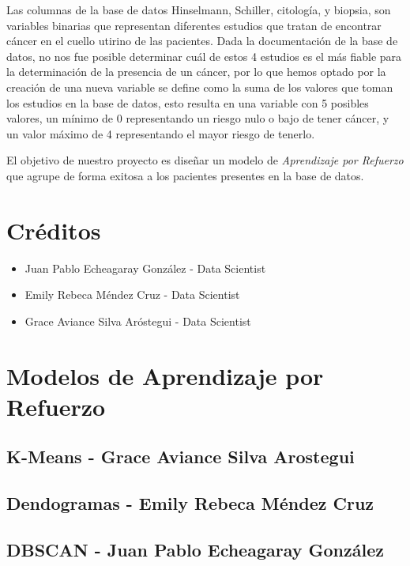\documentclass[journal]{IEEEtran}
\begin{document}
        Las columnas de la base de datos Hinselmann, Schiller, citología, y biopsia, son variables binarias que representan diferentes estudios que tratan de encontrar cáncer en el cuello utirino de las pacientes. Dada la documentación de la base de datos, no nos fue posible determinar cuál de estos 4 estudios es el más fiable para la determinación de la presencia de un cáncer, por lo que hemos optado por la creación de una nueva variable se define como la suma de los valores que toman los estudios en la base de datos, esto resulta en una variable con 5 posibles valores, un mínimo de 0 representando un riesgo nulo o bajo de tener cáncer, y un valor máximo de 4 representando el mayor riesgo de tenerlo.

        El objetivo de nuestro proyecto es diseñar un modelo de \emph{Aprendizaje por Refuerzo} que agrupe de forma exitosa a los pacientes presentes en la base de datos.

    \section{Créditos} \label{credits}
       
        \begin{itemize}
            \item Juan Pablo Echeagaray González - Data Scientist
            \item Emily Rebeca Méndez Cruz - Data Scientist
            \item Grace Aviance Silva Aróstegui - Data Scientist
        \end{itemize}

    \section{Modelos de Aprendizaje por Refuerzo} \label{modelos}

        \subsection{K-Means - Grace Aviance Silva Arostegui} \label{decision-tree}
            
        \subsection{Dendogramas - Emily Rebeca Méndez Cruz} \label{dendogram}

        \subsection{DBSCAN - Juan Pablo Echeagaray González} \label{neural-network}
\end{document}
